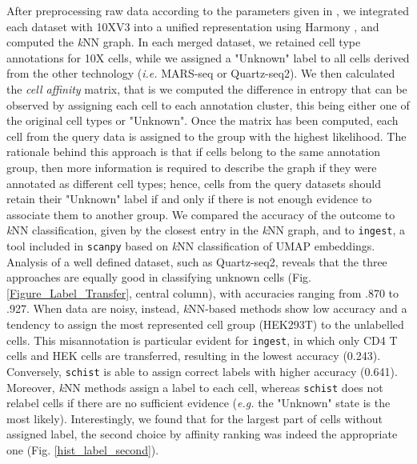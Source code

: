 \documentclass[10pt]{article}
\begin{document}
After preprocessing raw data according to the parameters given in \cite{mereu_2020}, we integrated each dataset with 10XV3 into a unified representation using Harmony \cite{Korsunsky_2019}, and computed the \emph{k}NN graph. In each merged dataset, we retained cell type annotations for 10X cells, while we assigned a "Unknown" label to all cells derived from the other technology (\emph{i.e.} MARS-seq or Quartz-seq2). We then calculated the \emph{cell affinity} matrix, that is we computed the difference in entropy that can be observed by assigning each cell to each annotation cluster, this being either one of the original cell types or "Unknown". Once the matrix has been computed, each cell from the query data is assigned to the group with the highest likelihood. The rationale behind this approach is that if cells belong to the same annotation group, then more information is required to describe the graph if they were annotated as different cell types; hence, cells from the query datasets should retain their "Unknown" label if and only if there is not enough evidence to associate them to another group. We compared the accuracy of the  outcome to \emph{k}NN classification, given by the closest entry in the \emph{k}NN graph, and to \texttt{ingest}, a tool included in \texttt{scanpy}  based on \emph{k}NN classification of UMAP embeddings. Analysis of a well defined dataset, such as Quartz-seq2, reveals that the three approaches are equally good in classifying unknown cells (Fig. \ref{Figure_Label_Transfer}, central column), with accuracies ranging from .870 to .927. When data are noisy, instead, \emph{k}NN-based methods show low accuracy and a tendency to assign the most represented cell group (HEK293T) to the unlabelled cells. This misannotation is particular evident for \texttt{ingest}, in which only CD4 T cells and HEK cells are transferred, resulting in the lowest accuracy (0.243). Conversely, \texttt{schist} is able to assign correct labels with higher accuracy (0.641). Moreover, \emph{k}NN methods assign a label to each cell, whereas \texttt{schist} does not relabel cells if there are no sufficient evidence (\emph{e.g.} the "Unknown" state is the most likely). Interestingly, we found that for the largest part of cells without assigned label, the second choice by affinity ranking was indeed the appropriate one (Fig. \ref{hist_label_second}).
\end{document}
